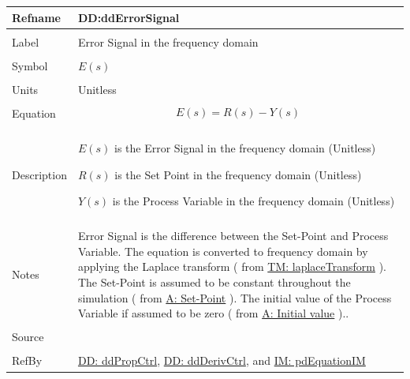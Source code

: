 \documentclass[12pt]{article}
\begin{document}
\vspace{\baselineskip}
\noindent
\begin{minipage}{\textwidth}
\begin{tabular}{>{\raggedright}p{}>{\raggedright\arraybackslash}p{}}
\toprule \textbf{Refname} & \textbf{DD:ddErrorSignal}
\label{DD:ddErrorSignal}
\\ \midrule \\
Label & Error Signal in the frequency domain
        
\\ \midrule \\
Symbol & $E(s)$
         
\\ \midrule \\
Units & Unitless
        
\\ \midrule \\
Equation & \begin{displaymath}
           E(s)=R(s)-Y(s)
           \end{displaymath}
\\ \midrule \\
Description & \begin{symbDescription}
              \item{$E(s)$ is the Error Signal in the frequency domain (Unitless)}
              \item{$R(s)$ is the Set Point in the frequency domain (Unitless)}
              \item{$Y(s)$ is the Process Variable in the frequency domain (Unitless)}
              \end{symbDescription}
\\ \midrule \\
Notes & Error Signal is the difference between the Set-Point and  Process Variable. The equation is converted to frequency domain by applying the Laplace transform ( from \hyperref[TM:laplaceTransform]{TM: laplaceTransform} ). The Set-Point is assumed to be constant throughout the simulation ( from  \hyperref[setPoint]{A: Set-Point} ). The initial value of the Process Variable if assumed to be zero ( from  \hyperref[initialValue]{A: Initial value} )..
        
\\ \midrule \\
Source & \cite{johnson2008}
         
\\ \midrule \\
RefBy & \hyperref[DD:ddPropCtrl]{DD: ddPropCtrl}, \hyperref[DD:ddDerivCtrl]{DD: ddDerivCtrl}, and \hyperref[IM:pdEquationIM]{IM: pdEquationIM}
        
\\ \bottomrule
\end{tabular}
\end{minipage}
\end{document}
